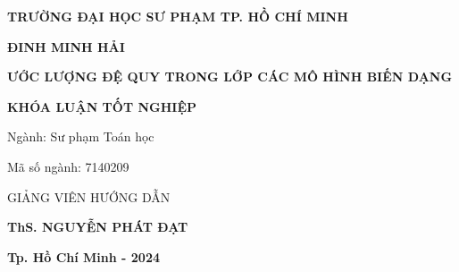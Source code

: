 \newpage
\thispagestyle{empty}
\begin{center}
{\bf  TRƯỜNG ĐẠI HỌC SƯ PHẠM TP. HỒ CHÍ MINH}\\


\vspace*{1.5cm}

{\bf  ĐINH MINH HẢI}

\vspace*{1.5cm}

{\huge\bf ƯỚC LƯỢNG ĐỆ QUY TRONG LỚP CÁC MÔ HÌNH BIẾN DẠNG}

\vspace*{1.5cm}

{\bf KHÓA LUẬN TỐT NGHIỆP}\\[20pt]
\end{center}
\vspace*{1.5cm}

{\fontsize{13}{1}\selectfont Ngành: Sư phạm Toán học} 

{\fontsize{13}{1}\selectfont Mã số ngành: 7140209}


\vspace*{3cm}

GIẢNG VIÊN HƯỚNG DẪN 

{\bf ThS. NGUYỄN PHÁT ĐẠT}

\vfill
\begin{center}
{\bf Tp. Hồ Chí Minh - 2024}
\end{center}


